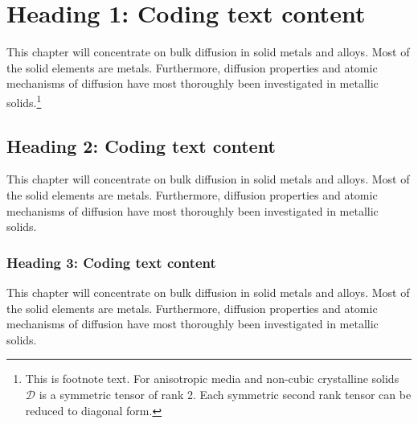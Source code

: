 \documentclass[cmbright]{WileySTAT-V1} %
\theoremstyle{plain}
\begin{document}
\section{Heading 1: Coding text content}\label{sec4}
This chapter will concentrate on bulk diffusion in solid metals and alloys. Most of the solid elements are metals. Furthermore, diffusion properties and atomic mechanisms of diffusion have most thoroughly been investigated in metallic solids.\footnote{This is footnote text. For anisotropic media and non-cubic crystalline solids $\mathcal{D}$ is a symmetric tensor of rank 2. Each symmetric second rank tensor can be reduced to diagonal form.}

\subsection{Heading 2: Coding text content}\label{sec4.1}
This chapter will concentrate on bulk diffusion in solid metals and alloys. Most of the solid elements are metals. Furthermore, diffusion properties and atomic mechanisms of diffusion have most thoroughly been investigated in metallic solids.

\subsubsection{Heading 3: Coding text content}
This chapter will concentrate on bulk diffusion in solid metals and alloys. Most of the solid elements are metals. Furthermore, diffusion properties and atomic mechanisms of diffusion have most thoroughly been investigated in metallic solids.
\end{document}
